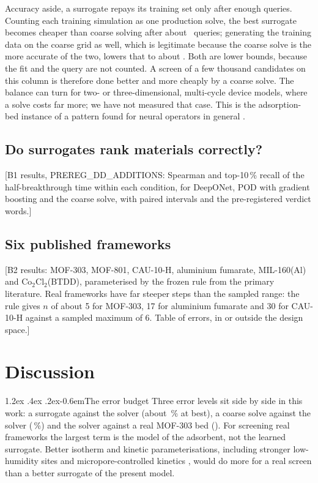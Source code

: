 \documentclass[10pt,a4paper]{article}
\makeatletter
\renewcommand\paragraph{\@startsection{paragraph}{4}{\z@}%
  {1.2ex \@plus .4ex \@minus .2ex}{-0.6em}{\normalfont\normalsize\bfseries}}
\makeatother
\begin{document}
Accuracy aside, a surrogate repays its training set only after enough queries. Counting
each training simulation as one production solve, the best surrogate becomes cheaper than
coarse solving after about \nCvsBeProd\ queries; generating the training data on the
coarse grid as well, which is legitimate because the coarse solve is the more accurate of
the two, lowers that to about \nCvsBeCoarse. Both are lower bounds, because the fit and the
query are not counted. A screen of a few thousand candidates on this column is therefore
done better and more cheaply by a coarse solve. The balance can turn for two- or
three-dimensional, multi-cycle device models, where a solve costs far more; we have not
measured that case. This is the adsorption-bed instance of a pattern found for neural
operators in general \cite{dehoop2022cost,huang2026cost}.

\subsection{Do surrogates rank materials correctly?}
\label{sec:screening}

[B1 results, PREREG\_DD\_ADDITIONS: Spearman and top-10\,\% recall of the
half-breakthrough time within each condition, for DeepONet, POD with gradient boosting and
the coarse solve, with paired intervals and the pre-registered verdict words.]

\subsection{Six published frameworks}
\label{sec:frameworks}

[B2 results: MOF-303, MOF-801, CAU-10-H, aluminium fumarate, MIL-160(Al) and
Co\(_2\)Cl\(_2\)(BTDD), parameterised by the frozen rule from the primary literature.
Real frameworks have far steeper steps than the sampled range: the rule gives \(n\) of about
5 for MOF-303, 17 for aluminium fumarate and 30 for CAU-10-H against a sampled maximum of
6. Table of errors, in or outside the design space.]

\section{Discussion}
\label{sec:discussion}

\paragraph{The error budget} Three error levels sit side by side in this work: a surrogate
against the solver (about \nCvsDon\,\% at best), a coarse solve against the solver
(\nCvsCoarse\,\%) and the solver against a real MOF-303 bed (\nAnchorNrmse). For screening
real frameworks the largest term is the model of the adsorbent, not the learned surrogate.
Better isotherm and kinetic parameterisations, including stronger low-humidity sites and
micropore-controlled kinetics \cite{hastings2024high,sircar2000why}, would do more for a
real screen than a better surrogate of the present model.
\end{document}
